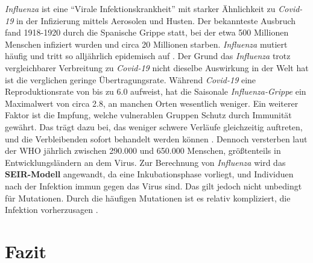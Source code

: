 \documentclass[12pt]{scrartcl} %
\begin{document}
\textsl{Influenza} ist eine "`Virale Infektionskrankheit"' mit starker Ähnlichkeit zu \textsl{Covid-19} in der Infizierung mittels Aerosolen und Husten. Der bekannteste Ausbruch fand 1918-1920 durch die Spanische Grippe statt, bei der etwa 500 Millionen Menschen infiziert wurden und circa 20 Millionen starben. \textsl{Influenza} mutiert häufig und tritt so alljährlich epidemisch auf \cite{2, 3}. Der Grund das \textit{Influenza} trotz vergleichbarer Verbreitung zu \textsl{Covid-19} nicht dieselbe Auswirkung in der Welt hat ist die verglichen geringe Übertragungsrate. Während \textsl{Covid-19} eine Reproduktionsrate von bis zu 6.0 aufweist, hat die Saisonale \textsl{Influenza-Grippe} ein Maximalwert von circa 2.8, an manchen Orten wesentlich weniger. Ein weiterer Faktor ist die Impfung, welche vulnerablen Gruppen Schutz durch Immunität gewährt. Das trägt dazu bei, das weniger schwere Verläufe gleichzeitig auftreten, und die Verbleibenden sofort behandelt werden können \cite{3}. Dennoch versterben laut der WHO jährlich zwischen 290.000 und 650.000 Menschen, größtenteils in Entwicklungsländern an dem Virus. Zur Berechnung von \textsl{Influenza} wird das \textbf{SEIR-Modell} angewandt, da eine Inkubationsphase vorliegt, und Individuen nach der Infektion immun gegen das Virus sind. Das gilt jedoch nicht unbedingt für Mutationen. Durch die häufigen Mutationen ist es relativ kompliziert, die Infektion vorherzusagen \cite{11}.



\newpage
\section{Fazit}
\end{document}
